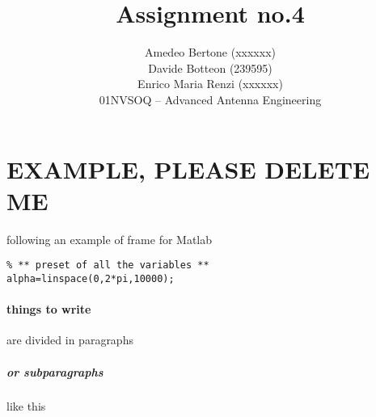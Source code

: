\documentclass[11pt,a4paper,twoside,openright]{article}
\begin{document}
\title{Assignment no.4}
\author{Amedeo Bertone (xxxxxx)\\Davide Botteon (239595)\\Enrico Maria Renzi (xxxxxx)\\
	01NVSOQ -- Advanced Antenna Engineering}
\maketitle






\section{EXAMPLE, PLEASE DELETE ME}
following an example of frame for Matlab
\begin{lstlisting}
% ** preset of all the variables **
alpha=linspace(0,2*pi,10000);
\end{lstlisting}
\paragraph{things to write} are divided in paragraphs
\subparagraph{or subparagraphs} like this
\end{document}

